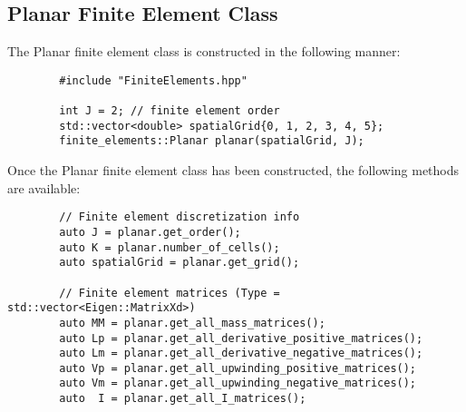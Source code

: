 \documentclass[../main.tex]{subfiles}
\begin{document}
    \subsection{Planar Finite Element Class}
    The Planar finite element class is constructed in the following manner:
    \begin{lstlisting}
        #include "FiniteElements.hpp"
        
        int J = 2; // finite element order
        std::vector<double> spatialGrid{0, 1, 2, 3, 4, 5};
        finite_elements::Planar planar(spatialGrid, J);
    \end{lstlisting}
    Once the Planar finite element class has been constructed, the following methods are available:
    \begin{lstlisting}
        // Finite element discretization info
        auto J = planar.get_order();
        auto K = planar.number_of_cells();
        auto spatialGrid = planar.get_grid();
        
        // Finite element matrices (Type = std::vector<Eigen::MatrixXd>)
        auto MM = planar.get_all_mass_matrices();
        auto Lp = planar.get_all_derivative_positive_matrices();
        auto Lm = planar.get_all_derivative_negative_matrices();
        auto Vp = planar.get_all_upwinding_positive_matrices();
        auto Vm = planar.get_all_upwinding_negative_matrices();
        auto  I = planar.get_all_I_matrices();
    \end{lstlisting}
    
\end{document}
